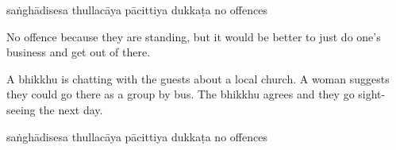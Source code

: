 \begin{exam}{\autoExamName}
\begin{problem*}
\begin{parts}
  \bigskip

  \begin{answers}{5}
    \bChoices
     saṅghādisesa\eAns
     thullacāya\eAns
     pācittiya\eAns
     dukkaṭa\eAns
     no offences\eAns
    \eChoices
  \end{answers}

  \begin{solution}
    No offence because they are standing, but it would be better to just do
    one's business and get out of there.
  \end{solution}

  \bigskip

\item A bhikkhu is chatting with the guests about a local church. A woman
  suggests they could go there as a group by bus. The bhikkhu agrees and they go
  sight-seeing the next day.

  \bigskip

  \begin{answers}{5}
    \bChoices
     saṅghādisesa\eAns
     thullacāya\eAns
     pācittiya\eAns
     dukkaṭa\eAns
     no offences\eAns
    \eChoices
  \end{answers}

\end{parts}

\end{problem*}

\end{exam}
